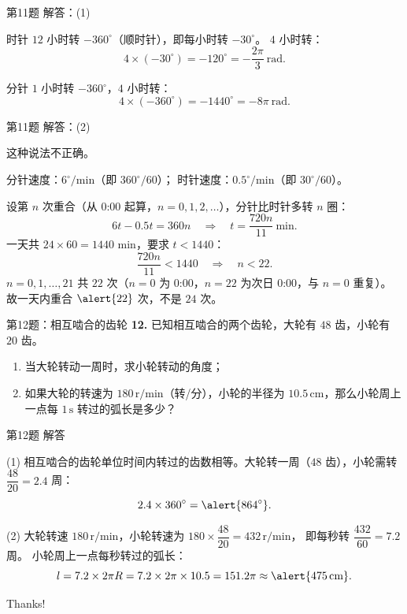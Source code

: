 \documentclass[10pt,aspectratio=169,serif]{beamer}
\begin{document}
\begin{frame}[t]{第11题 解答：(1)}
\begin{tcolorbox}[colback=orange!10,colframe=orange,title=\textbf{解：(1)}]
时针 $12$ 小时转 $-360^\circ$（顺时针），即每小时转 $-30^\circ$。
$4$ 小时转：
\[
4\times(-30^\circ) = -120^\circ = -\frac{2\pi}{3}\ \text{rad}.
\]

分针 $1$ 小时转 $-360^\circ$，$4$ 小时转：
\[
4\times(-360^\circ) = -1440^\circ = -8\pi\ \text{rad}.
\]
\end{tcolorbox}
\end{frame}

\begin{frame}[t]{第11题 解答：(2)}
\begin{tcolorbox}[colback=orange!10,colframe=orange,title=\textbf{解：(2)}]
这种说法\alert{不正确}。

\vspace{0.3em}
分针速度：$6^\circ/\text{min}$（即 $360^\circ/60$）；
时针速度：$0.5^\circ/\text{min}$（即 $30^\circ/60$）。

\vspace{0.3em}
设第 $n$ 次重合（从 0:00 起算，$n=0,1,2,\dots$），分针比时针多转 $n$ 圈：
\[
6t - 0.5t = 360n \quad\Longrightarrow\quad t = \frac{720n}{11}\ \text{min}.
\]
一天共 $24\times 60=1440$ min，要求 $t<1440$：
\[
\frac{720n}{11}<1440 \quad\Longrightarrow\quad n<22.
\]
$n=0,1,\dots,21$ 共 $22$ 次（$n=0$ 为 0:00，$n=22$ 为次日 0:00，与 $n=0$ 重复）。
故一天内重合 $\alert{22}$ 次，不是 $24$ 次。
\end{tcolorbox}
\end{frame}

\begin{frame}[t]{第12题：相互啮合的齿轮}
\textbf{12.} 已知相互啮合的两个齿轮，大轮有 $48$ 齿，小轮有 $20$ 齿。
\begin{enumerate}
  \item 当大轮转动一周时，求小轮转动的角度；
  \item 如果大轮的转速为 $180\,\text{r/min}$（转/分），小轮的半径为 $10.5\,\text{cm}$，那么小轮周上一点每 $1\,\text{s}$ 转过的弧长是多少？
\end{enumerate}
\end{frame}

\begin{frame}[t]{第12题 解答}
\begin{tcolorbox}[colback=orange!10,colframe=orange,title=\textbf{解}]
(1) 相互啮合的齿轮单位时间内转过的齿数相等。大轮转一周（$48$ 齿），小轮需转 $\dfrac{48}{20}=2.4$ 周：
\[
2.4\times 360^\circ = \alert{864^\circ}.
\]

(2) 大轮转速 $180\,\text{r/min}$，小轮转速为 $180\times\dfrac{48}{20}=432\,\text{r/min}$，
即每秒转 $\dfrac{432}{60}=7.2$ 周。
小轮周上一点每秒转过的弧长：
\[
l = 7.2\times 2\pi R = 7.2\times 2\pi\times 10.5 = 151.2\pi \approx \alert{475\,\text{cm}}.
\]
\end{tcolorbox}
\end{frame}

\begin{frame}[c]
  \begin{center}
    {\Huge\calligra Thanks!}
  \end{center}
\end{frame}
\end{document}

